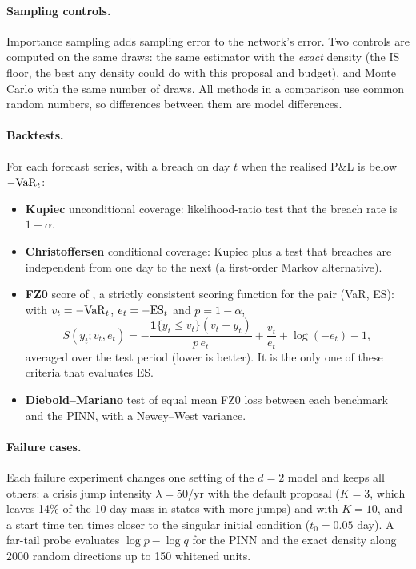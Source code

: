 \paragraph{Sampling controls.} Importance sampling adds sampling error to the network's error. Two controls are
computed on the same draws: the same estimator with the \emph{exact} density (the IS floor, the best any density
could do with this proposal and budget), and Monte Carlo with the same number of draws. All methods in a
comparison use common random numbers, so differences between them are model differences.

\paragraph{Backtests.} For each forecast series, with a breach on day $t$ when the realised P\&L is below
$-\mathrm{VaR}_t$:
\begin{itemize}
  \item \textbf{Kupiec} unconditional coverage: likelihood-ratio test that the breach rate is $1 - \alpha$.
  \item \textbf{Christoffersen} conditional coverage: Kupiec plus a test that breaches are independent from one
        day to the next (a first-order Markov alternative).
  \item \textbf{FZ0} score of \citet{patton2019}, a strictly consistent scoring function for the pair
        (VaR, ES): with $v_t = -\mathrm{VaR}_t$, $e_t = -\mathrm{ES}_t$ and $p = 1-\alpha$,
        \begin{equation}
          S(y_t; v_t, e_t) = -\frac{\mathbf{1}\{y_t \le v_t\}(v_t - y_t)}{p\, e_t} + \frac{v_t}{e_t} + \log(-e_t) - 1,
        \end{equation}
        averaged over the test period (lower is better). It is the only one of these criteria that evaluates ES.
  \item \textbf{Diebold--Mariano} test of equal mean FZ0 loss between each benchmark and the PINN, with a
        Newey--West variance.
\end{itemize}

\paragraph{Failure cases.} Each failure experiment changes one setting of the $d = 2$ model and keeps all
others: a crisis jump intensity $\lambda = 50$/yr with the default proposal ($K = 3$, which leaves 14\% of the
10-day mass in states with more jumps) and with $K = 10$, and a start time ten times closer to the singular
initial condition ($t_0 = 0.05$ day). A far-tail probe evaluates $\log p - \log q$ for the PINN and the exact
density along 2000 random directions up to 150 whitened units.

